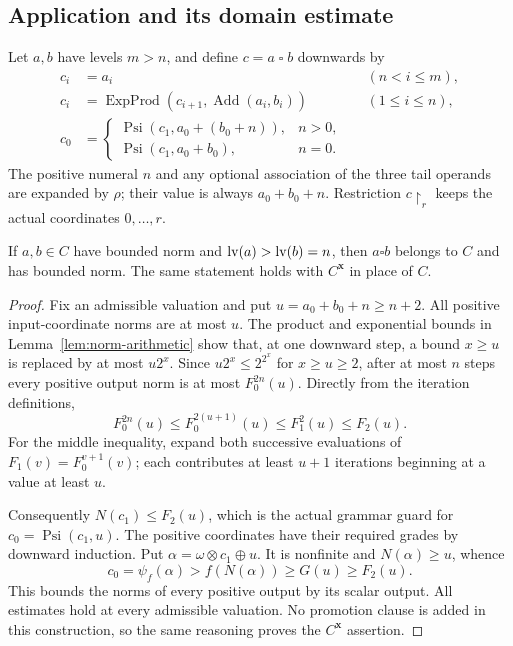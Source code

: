 \subsection{Application and its domain estimate}

Let $a,b$ have levels $m>n$, and define $c=a\mathbin\square b$
downwards by
\begin{align*}
 c_i&=a_i&& (n<i\le m),\\
 c_i&=\operatorname{ExpProd}(c_{i+1},\operatorname{Add}(a_i,b_i))
                                      &&(1\le i\le n),\\
 c_0&=\begin{cases}
 \operatorname{Psi}(c_1,a_0+(b_0+n)),&n>0,\\
 \operatorname{Psi}(c_1,a_0+b_0),&n=0.
 \end{cases}
\end{align*}
The positive numeral $n$ and any optional association of the three
tail operands are expanded by $\rho$; their value is always
$a_0+b_0+n$.  Restriction $c\upharpoonright_r$ keeps the actual
coordinates $0,\ldots,r$.

\begin{lemma}\label{lem:source-box}
If $a,b\in C$ have bounded norm and $\operatorname{lv}(a)>\operatorname{lv}(b)=n$, then
$a\square b$ belongs to $C$ and has bounded norm.  The same statement
holds with $C^{\mathbf x}$ in place of $C$.
\end{lemma}
\begin{proof}
Fix an admissible valuation and put $u=a_0+b_0+n\ge n+2$.
All positive input-coordinate norms are at most $u$.
The product and exponential bounds in Lemma~\ref{lem:norm-arithmetic}
show that, at one downward step, a bound $x\ge u$ is replaced by
at most $u2^x$.  Since $u2^x\le2^{2^x}$ for $x\ge u\ge2$,
after at most $n$ steps every positive output norm is at most
$F_0^{2n}(u)$.  Directly from the iteration definitions,
\[
 F_0^{2n}(u)\le F_0^{2(u+1)}(u)\le F_1^2(u)\le F_2(u).
\]
For the middle inequality, expand both successive evaluations of
$F_1(v)=F_0^{v+1}(v)$; each contributes at least $u+1$
iterations beginning at a value at least $u$.

Consequently $N(c_1)\le F_2(u)$, which is the actual grammar guard
for $c_0=\operatorname{Psi}(c_1,u)$.  The positive coordinates
have their required grades by downward induction.  Put
$\alpha=\omega\otimes c_1\oplus u$.  It is nonfinite and
$N(\alpha)\ge u$, whence
\[
 c_0=\psi_f(\alpha)>f(N(\alpha))\ge G(u)\ge F_2(u).
\]
This bounds the norms of every positive output by its scalar output.
All estimates hold at every admissible valuation.  No promotion clause
is added in this construction, so the same reasoning proves the
$C^{\mathbf x}$ assertion.
\end{proof}

